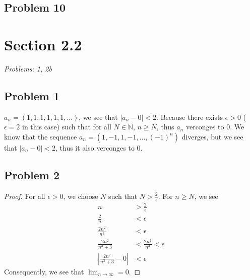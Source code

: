 \documentclass[12pt]{article}
\begin{document}
\subsection*{Problem 10}


\vspace*{1cm}


\section*{Section 2.2}
\textit{Problems: 1, 2b}
\subsection*{Problem 1}
$a_n = (1,1,1,1,1,1, \dots)$, we see that $|a_n - 0| < 2$.
Because there exists $\epsilon > 0$ ($\epsilon = 2$ in this case) such that for all $N \in \mathbb{N}$, $n \ge N$, thus $a_n$ verconges to $0$. 
We know that the sequence $a_n = (1,-1,1,-1, \dots, (-1)^{n})$ diverges, but we see that $|a_n - 0| < 2$, thus it also verconges to 0.


\subsection*{Problem 2}
\begin{proof}
    For all $\epsilon > 0$, we choose $N$ such that $N > \frac{2}{\epsilon}$.
    For $n \ge N$, we see 
    \begin{align*}
        n &> \frac{2}{\epsilon} \\
        \frac{2}{n} &< \epsilon \\
        \frac{2n^2}{n^3} &< \epsilon \\
        \frac{2n^2}{n^3 + 3} &< \frac{2n^2}{n^3} < \epsilon \\
        \left| {\frac{2n^2}{n^3 + 3} - 0} \right| &< \epsilon
    \end{align*}
    Consequently, we see that $\lim_{n \rightarrow \infty} = 0$. 
\end{proof}
\end{document}
